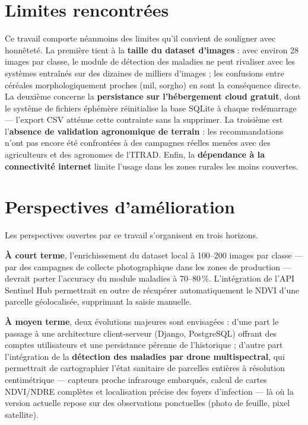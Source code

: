 \section*{Limites rencontrées}

Ce travail comporte néanmoins des limites qu'il convient de
souligner avec honnêteté. La première tient à la \textbf{taille
	du dataset d'images} : avec environ 28 images par classe, le
module de détection des maladies ne peut rivaliser avec les
systèmes entraînés sur des dizaines de milliers d'images ; les
confusions entre céréales morphologiquement proches (mil,
sorgho) en sont la conséquence directe. La deuxième concerne la
\textbf{persistance sur l'hébergement cloud gratuit}, dont le
système de fichiers éphémère réinitialise la base SQLite à
chaque redémarrage --- l'export CSV atténue cette contrainte
sans la supprimer. La troisième est l'\textbf{absence de
	validation agronomique de terrain} : les recommandations n'ont
pas encore été confrontées à des campagnes réelles menées avec
des agriculteurs et des agronomes de l'ITRAD. Enfin, la
\textbf{dépendance à la connectivité internet} limite l'usage
dans les zones rurales les moins couvertes.

\section*{Perspectives d'amélioration}

Les perspectives ouvertes par ce travail s'organisent en trois
horizons.

\medskip

\textbf{À court terme}, l'enrichissement du dataset local à
100--200 images par classe --- par des campagnes de collecte
photographique dans les zones de production --- devrait porter
l'accuracy du module maladies à 70--80\,\%. L'intégration de
l'API Sentinel Hub permettrait en outre de récupérer
automatiquement le NDVI d'une parcelle géolocalisée, supprimant
la saisie manuelle.

\medskip

\textbf{À moyen terme}, deux évolutions majeures sont
envisagées : d'une part le passage à une architecture
client-serveur (Django, PostgreSQL) offrant des comptes
utilisateurs et une persistance pérenne de l'historique ;
d'autre part l'intégration de la \textbf{détection des maladies
	par drone multispectral}, qui permettrait de cartographier
l'état sanitaire de parcelles entières à résolution
centimétrique --- capteurs proche infrarouge embarqués, calcul
de cartes NDVI/NDRE complètes et localisation précise des foyers
d'infection --- là où la version actuelle repose sur des
observations ponctuelles (photo de feuille, pixel satellite).

